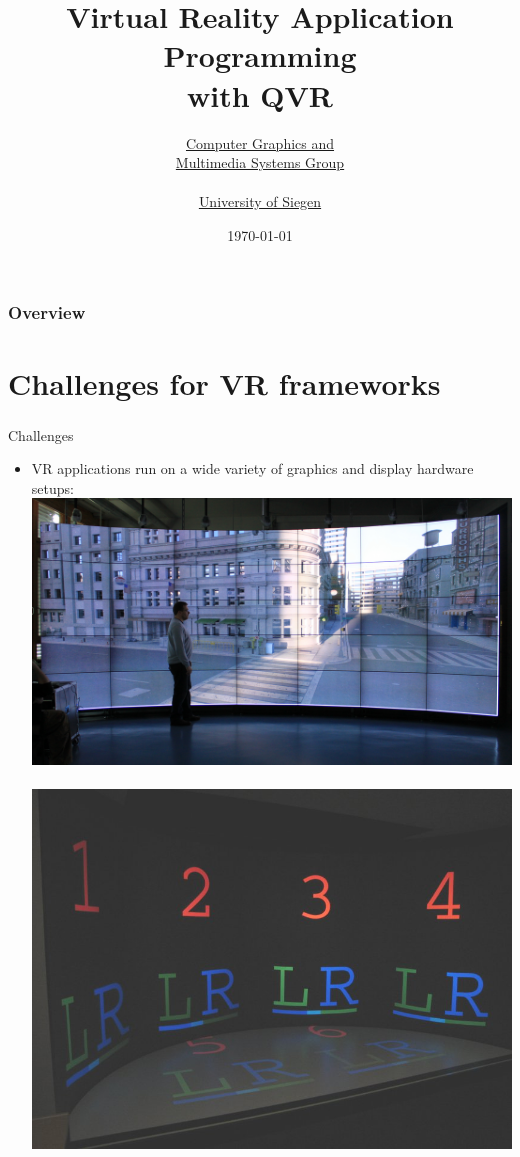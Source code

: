 \documentclass[utf8,stillsansserifmath,fleqn,t]{beamer}
\title[Virtual Reality Application Programming with QVR]
{Virtual Reality Application Programming\\with QVR}
\author[M. Lambers]%
{\href{http://www.cg.informatik.uni-siegen.de/}{Computer Graphics and\\
Multimedia Systems Group}\\~\\
\href{http://www.uni-siegen.de}{University of Siegen}}
\institute[University of Siegen]{~}
\date{\today}
\begin{document}
\begin{frame}
\titlepage
\end{frame}

\begin{frame}
\frametitle{Overview}
\tableofcontents
\end{frame}

\section{Challenges for VR frameworks}

\begin{frame}
\frametitle{\insertsection}
Challenges
\begin{itemize}
\item VR applications run on a wide variety of graphics and display hardware setups:\\
\includegraphics[height=.18\textheight]{./fig/hornet.jpg}~
\includegraphics[height=.18\textheight]{./fig/vrlab-unisiegen.jpg}~

\end{itemize}
\end{frame}
\end{document}

